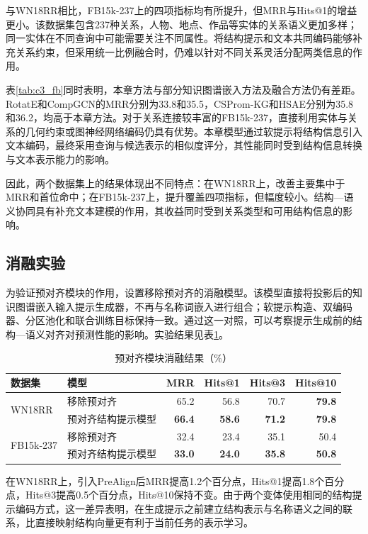 与WN18RR相比，FB15k-237上的四项指标均有所提升，但MRR与Hits@1的增益更小。该数据集包含237种关系，人物、地点、作品等实体的关系语义更加多样；同一实体在不同查询中可能需要关注不同属性。将结构提示和文本共同编码能够补充关系约束，但采用统一比例融合时，仍难以针对不同关系灵活分配两类信息的作用。

表\ref{tab:c3_fb}同时表明，本章方法与部分知识图谱嵌入方法及融合方法仍有差距。RotatE和CompGCN的MRR分别为33.8和35.5，CSProm-KG和HSAE分别为35.8和36.2，均高于本章方法。对于关系连接较丰富的FB15k-237，直接利用实体与关系的几何约束或图神经网络编码仍具有优势。本章模型通过软提示将结构信息引入文本编码，最终采用查询与候选表示的相似度评分，其性能同时受到结构信息转换与文本表示能力的影响。

因此，两个数据集上的结果体现出不同特点：在WN18RR上，改善主要集中于MRR和首位命中；在FB15k-237上，提升覆盖四项指标，但幅度较小。结构—语义协同具有补充文本建模的作用，其收益同时受到关系类型和可用结构信息的影响。

\subsection{消融实验}

为验证预对齐模块的作用，设置移除预对齐的消融模型。该模型直接将投影后的知识图谱嵌入输入提示生成器，不再与名称词嵌入进行组合；软提示构造、双编码器、分区池化和联合训练目标保持一致。通过这一对照，可以考察提示生成前的结构—语义对齐对预测性能的影响。实验结果见表\ref{tab:c3_ablation}。

\begin{table}[!htbp]
\centering
{}
\caption{预对齐模块消融结果（\%）}
\label{tab:c3_ablation}
\small
\begin{tabular}{llrrrr}
\toprule
数据集 & 模型 & MRR & Hits@1 & Hits@3 & Hits@10\\
\midrule
\multirow{2}{*}{WN18RR}
 & 移除预对齐 & 65.2 & 56.8 & 70.7 & \textbf{79.8}\\
 & 预对齐结构提示模型 & \textbf{66.4} & \textbf{58.6} & \textbf{71.2} & \textbf{79.8}\\
\midrule
\multirow{2}{*}{FB15k-237}
 & 移除预对齐 & 32.4 & 23.4 & 35.1 & 50.4\\
 & 预对齐结构提示模型 & \textbf{33.0} & \textbf{24.0} & \textbf{35.8} & \textbf{50.8}\\
\bottomrule
\end{tabular}
\end{table}

在WN18RR上，引入PreAlign后MRR提高1.2个百分点，Hits@1提高1.8个百分点，Hits@3提高0.5个百分点，Hits@10保持不变。由于两个变体使用相同的结构提示编码方式，这一差异表明，在生成提示之前建立结构表示与名称语义之间的联系，比直接映射结构向量更有利于当前任务的表示学习。


